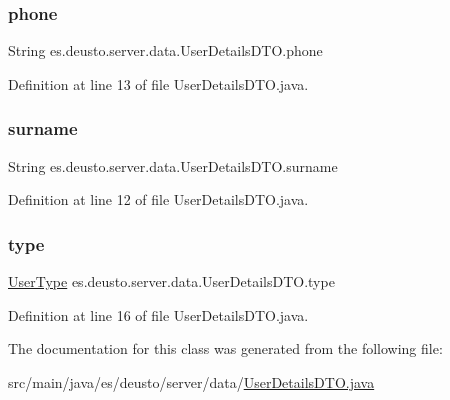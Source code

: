\subsubsection{\texorpdfstring{phone}{phone}}
{\footnotesize\ttfamily String es.\+deusto.\+server.\+data.\+User\+Details\+D\+T\+O.\+phone}



Definition at line 13 of file User\+Details\+D\+T\+O.\+java.

\mbox{\label{classes_1_1deusto_1_1server_1_1data_1_1_user_details_d_t_o_a330072900fcfa1074bfd830396b42fd3}} 
\subsubsection{\texorpdfstring{surname}{surname}}
{\footnotesize\ttfamily String es.\+deusto.\+server.\+data.\+User\+Details\+D\+T\+O.\+surname}



Definition at line 12 of file User\+Details\+D\+T\+O.\+java.

\mbox{\label{classes_1_1deusto_1_1server_1_1data_1_1_user_details_d_t_o_a0b9b66b5481b8d9bbb703238ec873f89}} 
\subsubsection{\texorpdfstring{type}{type}}
{\footnotesize\ttfamily \mbox{\hyperlink{enumes_1_1deusto_1_1server_1_1jdo_1_1_user_type}{User\+Type}} es.\+deusto.\+server.\+data.\+User\+Details\+D\+T\+O.\+type}



Definition at line 16 of file User\+Details\+D\+T\+O.\+java.



The documentation for this class was generated from the following file\+:\begin{DoxyCompactItemize}
\item 
src/main/java/es/deusto/server/data/\mbox{\hyperlink{_user_details_d_t_o_8java}{User\+Details\+D\+T\+O.\+java}}\end{DoxyCompactItemize}
